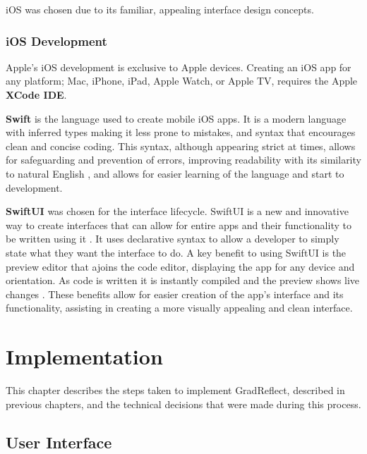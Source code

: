 \documentclass{l4proj}
\begin{document}
iOS was chosen due to its familiar, appealing interface design concepts.

\subsection{iOS Development}

Apple's iOS development is exclusive to Apple devices. Creating an iOS app for any platform; Mac, iPhone, iPad, Apple Watch, or Apple TV, requires the Apple \textbf{XCode IDE}. 

\textbf{Swift} is the language used to create mobile iOS apps. It is a modern language with inferred types making it less prone to mistakes, and syntax that encourages clean and concise coding. This syntax, although appearing strict at times, allows for safeguarding and prevention of errors, improving readability with its similarity to natural English \citep{altexsoft_swift_2021}, and allows for easier learning of the language and start to development.

\textbf{SwiftUI} was chosen for the interface lifecycle. SwiftUI is a new and innovative way to create interfaces that can allow for entire apps and their functionality to be written using it \citep{apple_developer_xcode_2021}. It uses declarative syntax to allow a developer to simply state what they want the interface to do. A key benefit to using SwiftUI is the preview editor that ajoins the code editor, displaying the app for any device and orientation. As code is written it is instantly compiled and the preview shows live changes \citep{apple_swiftui_2021}. These benefits allow for easier creation of the app's interface and its functionality, assisting in creating a more visually appealing and clean interface.



\chapter{Implementation} \label{implementation}

This chapter describes the steps taken to implement GradReflect, described in previous chapters, and the technical decisions that were made during this process.

\section{User Interface}
\end{document}
